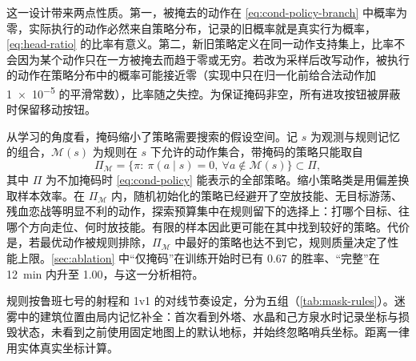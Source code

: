 这一设计带来两点性质。第一，被掩去的动作在 \cref{eq:cond-policy-branch} 中概率为零，实际执行的动作必然来自策略分布，记录的旧概率就是真实行为概率，\cref{eq:head-ratio} 的比率有意义\cite{huang2022masking}。第二，新旧策略定义在同一动作支持集上，比率不会因为某个动作只在一方被掩去而趋于零或无穷。若改为采样后改写动作，被执行的动作在策略分布中的概率可能接近零（实现中只在归一化前给合法动作加 \num{1e-5} 的平滑常数），比率随之失控。为保证掩码非空，所有进攻按钮被屏蔽时保留移动按钮。

从学习的角度看，掩码缩小了策略需要搜索的假设空间。记 $s$ 为观测与规则记忆的组合，$\mathcal M(s)$ 为规则在 $s$ 下允许的动作集合，带掩码的策略只能取自
\begin{equation}
  \Pi_{\mathcal M}=\bigl\{\pi:\ \pi(a\mid s)=0,\ \forall a\notin\mathcal M(s)\bigr\}\subset\Pi,
  \label{eq:policy-class}
\end{equation}
其中 $\Pi$ 为不加掩码时 \cref{eq:cond-policy} 能表示的全部策略。缩小策略类是用偏差换取样本效率。在 $\Pi_{\mathcal M}$ 内，随机初始化的策略已经避开了空放技能、无目标游荡、残血恋战等明显不利的动作，探索预算集中在规则留下的选择上：打哪个目标、往哪个方向走位、何时放技能。有限的样本因此更可能在其中找到较好的策略。代价是，若最优动作被规则排除，$\Pi_{\mathcal M}$ 中最好的策略也达不到它，规则质量决定了性能上限。\cref{sec:ablation} 中“仅掩码”在训练开始时已有 \num{0.67} 的胜率、“完整”在 \qty{12}{\minute} 内升至 \num{1.00}，与这一分析相符。

规则按鲁班七号的射程和 1v1 的对线节奏设定，分为五组（\cref{tab:mask-rules}）。迷雾中的建筑位置由局内记忆补全：首次看到外塔、水晶和己方泉水时记录坐标与损毁状态，未看到之前使用固定地图上的默认地标，并始终忽略哨兵坐标。距离一律用实体真实坐标计算。


